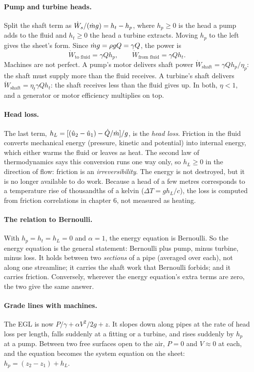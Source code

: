 \paragraph{Pump and turbine heads.} Split the shaft term as $\dot W_s/(\dot m g) = h_t - h_p$, where $h_p \ge 0$ is the head a pump adds to the fluid and $h_t \ge 0$ the head a turbine extracts. Moving $h_p$ to the left gives the sheet's form. Since $\dot m g = \rho gQ = \gamma Q$, the power is
\[
\dot W_\text{to fluid} = \gamma Qh_p,\qquad \dot W_\text{from fluid} = \gamma Qh_t .
\]
Machines are not perfect. A pump's motor delivers shaft power $\dot W_\text{shaft} = \gamma Qh_p/\eta_p$: the shaft must supply more than the fluid receives. A turbine's shaft delivers $\dot W_\text{shaft} = \eta_t\gamma Qh_t$: the shaft receives less than the fluid gives up. In both, $\eta < 1$, and a generator or motor efficiency multiplies on top.

\paragraph{Head loss.} The last term, $h_L = [(\hat u_2 - \hat u_1) - \dot Q/\dot m]/g$, is the \emph{head loss}. Friction in the fluid converts mechanical energy (pressure, kinetic and potential) into internal energy, which either warms the fluid or leaves as heat. The second law of thermodynamics says this conversion runs one way only, so $h_L \ge 0$ in the direction of flow: friction is an \emph{irreversibility}. The energy is not destroyed, but it is no longer available to do work. Because a head of a few metres corresponds to a temperature rise of thousandths of a kelvin ($\Delta T = gh_L/c$), the loss is computed from friction correlations in chapter 6, not measured as heating.

\paragraph{The relation to Bernoulli.} With $h_p = h_t = h_L = 0$ and $\alpha = 1$, the energy equation is Bernoulli. So the energy equation is the general statement: Bernoulli plus pump, minus turbine, minus loss. It holds between two \emph{sections} of a pipe (averaged over each), not along one streamline; it carries the shaft work that Bernoulli forbids; and it carries friction. Conversely, wherever the energy equation's extra terms are zero, the two give the same answer.

\paragraph{Grade lines with machines.} The EGL is now $P/\gamma + \alpha V^2/2g + z$. It slopes down along pipes at the rate of head loss per length, falls suddenly at a fitting or a turbine, and rises suddenly by $h_p$ at a pump. Between two free surfaces open to the air, $P = 0$ and $V\approx0$ at each, and the equation becomes the system equation on the sheet: $h_p = (z_2 - z_1) + h_L$.

